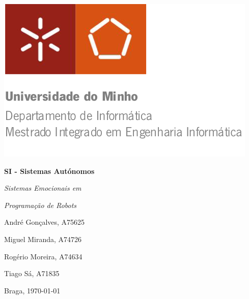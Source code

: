 \begin{titlepage}


\begin{minipage}{0.6\textwidth}
\begin{flushleft} 
\includegraphics[width=\textwidth]{./Imagens/logo.png}
\end{flushleft}
\end{minipage}

\vspace{3cm}

\Huge
\textbf{SI - Sistemas Autónomos\\}

\huge
\textit{Sistemas Emocionais em}

\textit{Programação de Robots}



\vfill
\normalsize

André Gonçalves, A75625

Miguel Miranda, A74726

Rogério Moreira, A74634

Tiago Sá, A71835

\vfill
Braga, {\today}

\end{titlepage}
\restoregeometry